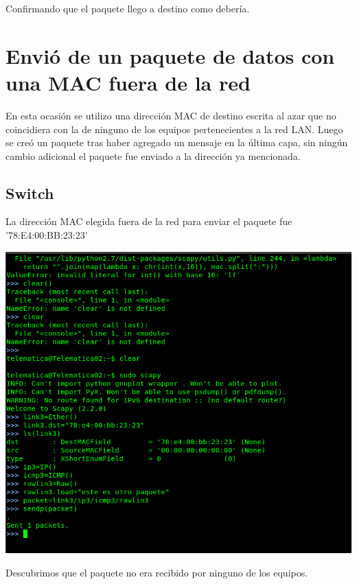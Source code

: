 \documentclass[spanish]{udpreport}
\begin{document}
Confirmando que el paquete llego a destino como debería.

\pagebreak

\section{Envió de un paquete de datos con una MAC fuera de la red}

En esta ocasión se utilizo una dirección MAC de destino escrita al azar que no coincidiera con la de ninguno de los equipos pertenecientes a la red LAN. Luego se creó un paquete tras haber agregado un mensaje en la última capa, sin ningún cambio adicional el paquete fue enviado a la dirección ya mencionada.


\subsection{Switch}

La dirección MAC elegida fuera de la red para enviar el paquete fue '78:E4:00:BB:23:23'

\begin{center}
	\includegraphics[scale=.37]{imagenes/Switch/Test_3.png}
\end{center}

Descubrimos que el paquete no era recibido por ninguno de los equipos.
\end{document}
